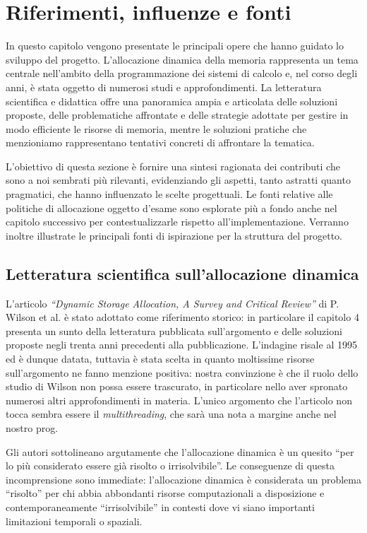 \chapter{Riferimenti, influenze e fonti}

In questo capitolo vengono presentate le principali opere che hanno guidato lo sviluppo del progetto. L’allocazione dinamica della memoria rappresenta un tema centrale nell’ambito della programmazione dei sistemi di calcolo e, nel corso degli anni, è stata oggetto di numerosi studi e approfondimenti. La letteratura scientifica e didattica offre una panoramica ampia e articolata delle soluzioni proposte, delle problematiche affrontate e delle strategie adottate per gestire in modo efficiente le risorse di memoria, mentre le soluzioni pratiche che menzioniamo rappresentano tentativi concreti di affrontare la tematica. 

L’obiettivo di questa sezione è fornire una sintesi ragionata dei contributi che sono a noi sembrati più rilevanti, evidenziando gli aspetti, tanto astratti quanto pragmatici, che hanno influenzato le scelte progettuali. Le fonti relative alle politiche di allocazione oggetto d'esame sono esplorate più a fondo anche nel capitolo successivo per contestualizzarle rispetto all'implementazione. Verranno inoltre illustrate le principali fonti di ispirazione per la struttura del progetto.

\section{Letteratura scientifica sull’allocazione dinamica}

L’articolo \textit{``Dynamic Storage Allocation, A Survey and Critical Review''} di P. Wilson et al.\cite{wilson1995} è stato adottato come riferimento storico: in particolare il capitolo 4 presenta un sunto della letteratura pubblicata sull’argomento e delle soluzioni proposte negli trenta anni precedenti alla pubblicazione. L'indagine risale al 1995 ed è dunque datata, tuttavia è stata scelta in quanto moltissime risorse sull'argomento ne fanno menzione positiva: nostra convinzione è che il ruolo dello studio di Wilson non possa essere trascurato, in particolare nello aver spronato numerosi altri approfondimenti in materia. L'unico argomento che l'articolo non tocca sembra essere il \textit{multithreading}, che sarà una nota a margine anche nel nostro prog. 

Gli autori sottolineano argutamente che l'allocazione dinamica è un quesito ``per lo più considerato essere già risolto o irrisolvibile''. Le conseguenze di questa incomprensione sono immediate: l’allocazione dinamica è considerata un problema ``risolto'' per chi abbia abbondanti risorse computazionali a disposizione e contemporaneamente ``irrisolvibile'' in contesti dove vi siano importanti limitazioni temporali o spaziali. 

